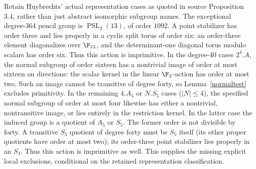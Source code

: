 Retain Huybrechts' actual representation cases as quoted in source
Proposition 3.4, rather than just abstract isomorphic subgroup names.
The exceptional degree-364 pencil group is $\operatorname{PSL}_2(13)$,
of order $1092$. A point stabilizer has order three and lies properly
in a cyclic split torus of order six: an order-three element diagonalizes
over $\F_{13}$, and the determinant-one diagonal torus modulo scalars
has order six. Thus this action is imprimitive. In the degree-40 cases
$2^4.A$, the normal subgroup of order sixteen has a nontrivial image
of order at most sixteen on directions: the scalar kernel in the
linear $\F_3$-action has order at most two. Such an image cannot be
transitive of degree forty, so Lemma~\ref{normaltest} excludes
primitivity. In the remaining $4.A_5$ or $N.S_5$ cases ($|N|\leq4$),
the specified normal subgroup of order at most four likewise has either
a nontrivial, nontransitive image, or lies entirely in the restriction
kernel. In the latter case the induced group is a quotient of $A_5$
or $S_5$. The former order is not divisible by forty. A transitive
$S_5$ quotient of degree forty must be $S_5$ itself (its other proper
quotients have order at most two); its order-three point stabilizer
lies properly in an $S_3$. Thus this action is imprimitive as well.
This supplies the missing explicit local exclusions, conditional on
the retained representation classification.

